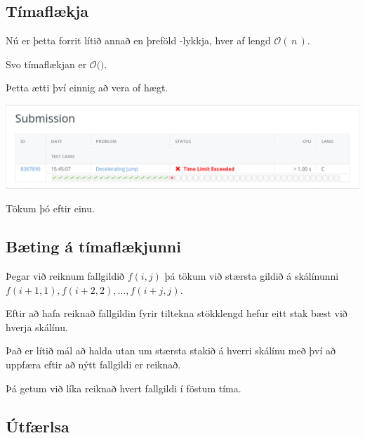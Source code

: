 \subsection{Tímaflækja}
{
    {
        \item<1-> Nú er þetta forrit lítið annað en þreföld -lykkja, hver af lengd $\mathcal{O}(\,n\,)$.
        \item<2-> Svo tímaflækjan er $\mathcal{O}($$)$.
        \item<4-> Þetta ætti því einnig að vera of hægt.
        \item<5->[] \includegraphics[scale = 0.25]{fig/tle2.png}
        \item<6-> Tökum þó eftir einu.
    }
}

\subsection{Bæting á tímaflækjunni}
{
    {
        \item<1-> Þegar við reiknum fallgildið $f(i, j)$ þá tökum við stærsta gildið á skálínunni $f(i + 1, 1), f(i + 2, 2), \dots, f(i + j, j)$.
        \item<2-> Eftir að hafa reiknað fallgildin fyrir tiltekna stökklengd hefur eitt stak bæst við hverja skálínu.
        \item<3-> Það er lítið mál að halda utan um stærsta stakið á hverri skálínu með því að uppfæra eftir að nýtt fallgildi er reiknað.
        \item<4-> Þá getum við líka reiknað hvert fallgildi í föstum tíma.
    }
}

\subsection{Útfærlsa}
{
}

